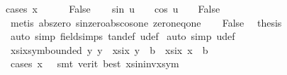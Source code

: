 \begin{isabellebody}
%
\isadelimproof
%
\endisadelimproof
%
\isatagproof
{}\isamarkupfalse%
{\isacharparenleft}{\kern0pt}cases\ {\isachardoublequoteopen}x\ {\isacharequal}{\kern0pt}\ {}{\isachardoublequoteclose}{\isacharparenright}{\kern0pt}\isanewline
\ \ \isamarkupfalse%
\ False\isanewline
\ \ \isamarkupfalse%
\ {\isachardoublequoteopen}sin\ u\ {\isacharequal}{\kern0pt}\ {}\ {\isasymLongrightarrow}\ cos\ u\ {\isacharequal}{\kern0pt}\ {}\ {\isasymLongrightarrow}\ False{\isachardoublequoteclose}\isanewline
\ \ \ \ \isamarkupfalse%
\ {\isacharparenleft}{\kern0pt}metis\ abs{\isacharunderscore}{\kern0pt}zero\ sin{\isacharunderscore}{\kern0pt}zero{\isacharunderscore}{\kern0pt}abs{\isacharunderscore}{\kern0pt}cos{\isacharunderscore}{\kern0pt}one\ zero{\isacharunderscore}{\kern0pt}neq{\isacharunderscore}{\kern0pt}one{\isacharparenright}{\kern0pt}\isanewline
\ \ \isamarkupfalse%
\ False\ \isamarkupfalse%
\ {\isacharquery}{\kern0pt}thesis\isanewline
\ \ \ \ \isamarkupfalse%
\ {\isacharparenleft}{\kern0pt}auto\ simp{\isacharcolon}{\kern0pt}\ field{\isacharunderscore}{\kern0pt}simps\ tan{\isacharunderscore}{\kern0pt}def\ u{\isacharunderscore}{\kern0pt}def{\isacharparenright}{\kern0pt}\isanewline
{}\isamarkupfalse%
\ {\isacharparenleft}{\kern0pt}auto\ simp{\isacharcolon}{\kern0pt}\ u{\isacharunderscore}{\kern0pt}def{\isacharparenright}{\kern0pt}%
\endisatagproof
{\isafoldproof}%
%
\isadelimproof
\isanewline
%
\endisadelimproof
\isanewline
\isanewline
\isanewline
\isanewline
{}\isamarkupfalse%
\ xsix{\isacharunderscore}{\kern0pt}sym{\isacharunderscore}{\kern0pt}bounded{\isacharcolon}{\kern0pt}\ {\isachardoublequoteopen}{\isacharparenleft}{\kern0pt}{\isasymAnd}y{\isachardot}{\kern0pt}\ y{\isasymge}{}\ {\isasymLongrightarrow}\ xsix\ y\ {\isasymge}\ b{\isacharparenright}{\kern0pt}\ {\isasymLongrightarrow}\ xsix\ x\ {\isasymge}\ b{\isachardoublequoteclose}\isanewline
%
\isadelimproof
\ \ %
\endisadelimproof
%
\isatagproof
{}\isamarkupfalse%
\ {\isacharparenleft}{\kern0pt}cases\ {\isachardoublequoteopen}x\ {\isasymge}\ {}{\isachardoublequoteclose}{\isacharparenright}{\kern0pt}\ {\isacharparenleft}{\kern0pt}smt\ {\isacharparenleft}{\kern0pt}verit{\isacharcomma}{\kern0pt}\ best{\isacharparenright}{\kern0pt}\ xsininvx{\isacharunderscore}{\kern0pt}sym{\isacharparenleft}{\kern0pt}{}{\isacharparenright}{\kern0pt}{\isacharparenright}{\kern0pt}{\isacharplus}{\kern0pt}%

\end{isabellebody}

